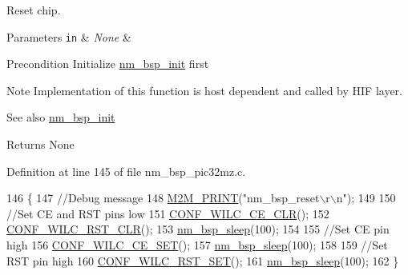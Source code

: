 Reset chip. 


\begin{DoxyParams}[1]{Parameters}
\mbox{\tt in}  & {\em None} & \\
\hline
\end{DoxyParams}
\begin{DoxyPrecond}{Precondition}
Initialize \hyperlink{group__NmBspInitFn_ga91533a50cf3da832110a746b4a57789e}{nm\+\_\+bsp\+\_\+init} first 
\end{DoxyPrecond}
\begin{DoxyNote}{Note}
Implementation of this function is host dependent and called by H\+IF layer. 
\end{DoxyNote}
\begin{DoxySeeAlso}{See also}
\hyperlink{group__NmBspInitFn_ga91533a50cf3da832110a746b4a57789e}{nm\+\_\+bsp\+\_\+init} 
\end{DoxySeeAlso}
\begin{DoxyReturn}{Returns}
None 
\end{DoxyReturn}


Definition at line 145 of file nm\+\_\+bsp\+\_\+pic32mz.\+c.


\begin{DoxyCode}
146 \{
147    \textcolor{comment}{//Debug message}
148    \hyperlink{nm__common_8h_a151ceaaab8f30c48e1e6aec3f3eff194}{M2M\_PRINT}(\textcolor{stringliteral}{"nm\_bsp\_reset\(\backslash\)r\(\backslash\)n"});
149 
150    \textcolor{comment}{//Set CE and RST pins low}
151    \hyperlink{wilc1000__config_8h_a2c7452c304b06d0a3de20581649d5366}{CONF\_WILC\_CE\_CLR}();
152    \hyperlink{wilc1000__config_8h_a3f7b23697dd49e31cf71def127f47f59}{CONF\_WILC\_RST\_CLR}();
153    \hyperlink{group__NmBspSleepFn_gadbf38ddf0138d8e0a4e4720909a7b081}{nm\_bsp\_sleep}(100);
154 
155    \textcolor{comment}{//Set CE pin high}
156    \hyperlink{wilc1000__config_8h_a48c14428083b7fe8b3a843a6d22b1909}{CONF\_WILC\_CE\_SET}();
157    \hyperlink{group__NmBspSleepFn_gadbf38ddf0138d8e0a4e4720909a7b081}{nm\_bsp\_sleep}(100);
158 
159    \textcolor{comment}{//Set RST pin high}
160    \hyperlink{wilc1000__config_8h_a7607648f71dcb5ea8cf40d436de55dab}{CONF\_WILC\_RST\_SET}();
161    \hyperlink{group__NmBspSleepFn_gadbf38ddf0138d8e0a4e4720909a7b081}{nm\_bsp\_sleep}(100);
162 \}
\end{DoxyCode}

